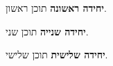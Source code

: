 \newcommand{\fssec}[1]{\par\textbf{#1}}

\fssec{יחידה ראשונה}
תוכן ראשון.

\fssec{יחידה שנייה}
תוכן שני.

\fssec{יחידה שלישית}
תוכן שלישי.

